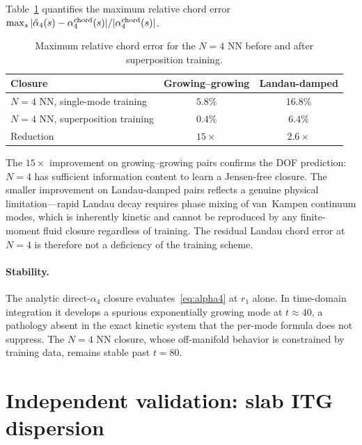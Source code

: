 \documentclass[11pt]{article}
\begin{document}
Table~\ref{tab:n4chord} quantifies the maximum relative chord error
$\max_s|\hat\alpha_4(s)-\alpha_4^{\rm chord}(s)|/|\alpha_4^{\rm chord}(s)|$.

\begin{table}[H]
\centering
\caption{Maximum relative chord error for the $N=4$ NN before and after
superposition training.}
\label{tab:n4chord}
\begin{tabular}{lcc}
\toprule
Closure & Growing--growing & Landau-damped \\
\midrule
$N=4$ NN, single-mode training   & $5.8\%$    & $16.8\%$   \\
$N=4$ NN, superposition training & $0.4\%$    & $6.4\%$    \\
Reduction                        & $15\times$ & $2.6\times$ \\
\bottomrule
\end{tabular}
\end{table}

The $15\times$ improvement on growing--growing pairs confirms the DOF
prediction: $N=4$ has sufficient information content to learn a Jensen-free
closure.  The smaller improvement on Landau-damped pairs reflects a genuine
physical limitation---rapid Landau decay requires phase mixing of van~Kampen
continuum modes, which is inherently kinetic and cannot be reproduced by any
finite-moment fluid closure regardless of training.  The residual Landau chord
error at $N=4$ is therefore not a deficiency of the training scheme.

\paragraph{Stability.}
The analytic direct-$\alpha_4$ closure evaluates~\eqref{eq:alpha4} at $r_1$
alone.  In time-domain integration it develops a spurious exponentially growing
mode at $t\approx 40$, a pathology absent in the exact kinetic system that the
per-mode formula does not suppress.  The $N=4$ NN closure, whose off-manifold
behavior is constrained by training data, remains stable past $t=80$.

\section{Independent validation: slab ITG dispersion}
\label{sec:itg}
\end{document}
